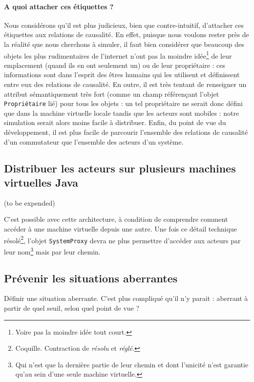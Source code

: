 \documentclass[11pt]{article}
\begin{document}
\paragraph{A quoi attacher ces étiquettes ?} Nous considérons qu'il est plus judicieux, bien que contre-intuitif, d'attacher ces étiquettes aux relations de causalité. En effet, puisque nous voulons rester près de la réalité que nous cherchons à simuler, il faut bien considérer que beaucoup des objets les plus rudimentaires de l'internet n'ont pas la moindre idée\footnote{Voire pas la moindre idée tout court.} de leur emplacement (quand ils en ont seulement un) ou de leur propriétaire : ces informations sont dans l'esprit des êtres humains qui les utilisent et définissent entre eux des relations de causalité. En outre, il est très tentant de renseigner un attribut sémantiquement très fort (comme un champ référençant l'objet \texttt{Propriétaire} lié) pour tous les objets : un tel propriétaire ne serait donc défini que dans la machine virtuelle locale tandis que les acteurs sont mobiles : notre simulation serait alors moins facile à distribuer. Enfin, du point de vue du développement, il est plus facile de parcourir l'ensemble des relations de causalité d'un commutateur que l'ensemble des acteurs d'un système.

\subsection{Distribuer les acteurs sur plusieurs machines virtuelles Java}

(to be expended)

C'est possible avec cette architecture, à condition de comprendre comment accéder à une machine virtuelle depuis une autre. Une fois ce détail technique résolé\footnote{Coquille. Contraction de \textsl{résolu} et \textsl{réglé}.}, l'objet \texttt{SystemProxy} devra ne plus permettre d'accéder aux acteurs par leur nom\footnote{Qui n'est que la dernière partie de leur chemin et dont l'unicité n'est garantie qu'au sein d'une seule machine virtuelle.} mais par leur chemin.	

\subsection{Prévenir les situations aberrantes}

Définir une situation aberrante. C'est plus compliqué qu'il n'y parait : aberrant à partir de quel seuil, selon quel point de vue ?
\end{document}

